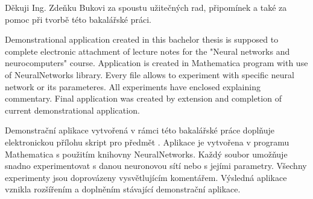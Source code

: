 \documentclass[11pt,twoside,a4paper]{book}
\begin{document}

\coverpagestarts


\acknowledgements
\noindent
Děkuji Ing. Zdeňku Bukovi za spoustu užitečných rad, připomínek a také za pomoc při tvorbě této bakalářské práci.





 
\abstractpage

Demonstrational application created in this bachelor thesis is supposed to complete electronic attachment of lecture notes for the "Neural networks and neurocomputers" course. Application is created in Mathematica program with use of NeuralNetworks library. Every file allows to experiment with specific neural network or its parameteres. All experiments have enclosed explaining commentary. Final application was created by extension and completion of current demonstrational application.

\baselineskip

\noindent
Demonstrační aplikace vytvořená v rámci této bakalářské práce doplňuje elektronickou přílohu skript pro předmět . Aplikace je vytvořena v programu Mathematica s použitím knihovny NeuralNetworks. Každý soubor umožňuje snadno experimentovat s danou neuronovou sítí nebo s jejími parametry. Všechny experimenty jsou doprovázeny vysvětlujícím komentářem. Výsledná aplikace vznikla rozšířením a doplněním stávající demonstrační aplikace.


\tableofcontents



\listoffigures



\listoftables


\end{document}

